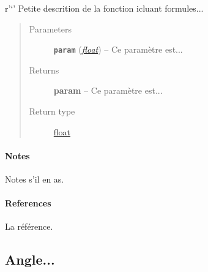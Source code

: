 \documentclass[letterpaper,10pt,english]{sphinxmanual}
\begin{document}
\begin{fulllineitems}
\label{python:solar_mod.normale_solaire}
r'`' Petite descrition de la fonction icluant formules...
\begin{quote}\begin{description}
\item[{Parameters}] \leavevmode
\textbf{\texttt{param}} (\href{https://docs.python.org/library/functions.html\#float}{\emph{float}}) -- Ce paramètre est...

\item[{Returns}] \leavevmode
\textbf{param} -- Ce paramètre est...

\item[{Return type}] \leavevmode
\href{https://docs.python.org/library/functions.html\#float}{float}

\end{description}\end{quote}
\paragraph{Notes}

Notes s'il en as.
\paragraph{References}

La référence.

\end{fulllineitems}



\subsection{Angle...}
\label{python:angle}
\end{document}
